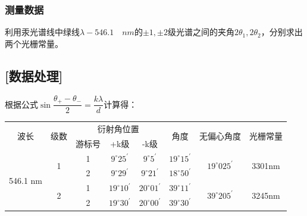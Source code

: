 \documentclass[12pt,a4paper,UTF8]{ctexart}
\begin{document}
\subsubsection*{测量数据}
\par 利用汞光谱线中绿线$\lambda - 546.1\quad nm$的$\pm 1,\pm 2$级光谱之间的夹角$2\theta_1,2\theta_2$，分别求出两个光栅常量。
\subsection*{[数据处理]}
\par 根据公式$\sin{\dfrac{\theta_{+}-\theta_{-}}{2}}=\dfrac{k \lambda}{d}$计算得：
\begin{table}[!htbp]
	\centering
	\begin{tabular}{c|c|ccc|c|c|c}
		\hline
		\multirow{2}{*}{波长}    & \multirow{2}{*}{级数} & \multicolumn{3}{c|}{衍射角位置}                                   & \multirow{2}{*}{角度} & \multirow{2}{*}{无偏心角度}  & \multirow{2}{*}{光栅常量} \\ \cline{3-5}
		&                     & \multicolumn{1}{c|}{游标号} & \multicolumn{1}{c|}{+k级}    & -k级     &                     &                         &                       \\ \hline
		\multirow{4}{*}{546.1 nm} & \multirow{2}{*}{1}  & \multicolumn{1}{c|}{1}   & \multicolumn{1}{c|}{$9^{\circ}25^{\prime}$} & $9^{\circ}5^{\prime}$   & $19^{\circ}15^{\prime}$               & \multirow{2}{*}{$19^{\circ}025^{\prime}$} & \multirow{2}{*}{3301nm}     \\ \cline{3-6}
		&                     & \multicolumn{1}{c|}{2}   & \multicolumn{1}{c|}{$9^{\circ}29^{\prime}$} & $9^{\circ}21^{\prime}$  & $18^{\circ}50^{\prime}$                &                         &                       \\ \cline{2-8} 
		& \multirow{2}{*}{2}  & \multicolumn{1}{c|}{1}   & \multicolumn{1}{c|}{$19^{\circ}10^{\prime}$} & $20^{\circ}01^{\prime}$ & $39^{\circ}11^{\prime}$               & \multirow{2}{*}{$39^{\circ}205^{\prime}$} & \multirow{2}{*}{3245nm}     \\ \cline{3-6}
		&                     & \multicolumn{1}{c|}{2}   & \multicolumn{1}{c|}{$19^{\circ}30^{\prime}$} & $20^{\circ}00^{\prime}$    & $39^{\circ}30^{\prime}$                &                         &                       \\ \hline
	\end{tabular}	
\end{table}
\end{document}

